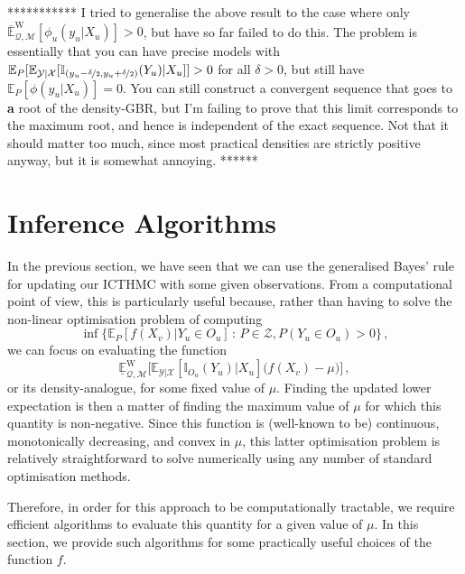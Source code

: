 \documentclass[twoside,11pt]{article}
\newcommand{\states}{\mathcal{X}}
\newcommand{\observs}{\mathcal{Y}}
\newcommand{\lexp}{\underline{\mathbb{E}}_{\rateset,\mathcal{M}}^\mathrm{W}}
\newcommand{\uexp}{\overline{\mathbb{E}}_{\rateset,\mathcal{M}}^\mathrm{W}}
\newcommand{\ind}[1]{\mathbb{I}_{#1}}
\newcommand{\rateset}{\mathcal{Q}}
\begin{document}
*********** I tried to generalise the above result to the case where only $\uexp[\phi_u(y_u\vert X_u)]>0$, but have so far failed to do this. The problem is essentially that you can have precise models with $\mathbb{E}_P[\mathbb{E}_{\observs\vert\states}[\ind{(y_u-\nicefrac{\delta}{2},y_u+\nicefrac{\delta}{2})}(Y_u)\vert X_u]] > 0$ for all $\delta>0$, but still have $\mathbb{E}_P[\phi(y_u\vert X_u)]=0$. You can still construct a convergent sequence that goes to {\bf a} root of the density-GBR, but I'm failing to prove that this limit corresponds to the maximum root, and hence is independent of the exact sequence. Not that it should matter too much, since most practical densities are strictly positive anyway, but it is somewhat annoying. ******


\section{Inference Algorithms}\label{sec:inference_algos}

In the previous section, we have seen that we can use the generalised Bayes' rule for updating our ICTHMC with some given observations. From a computational point of view, this is particularly useful because, rather than having to solve the non-linear optimisation problem of computing
\begin{equation*}
\inf\bigl\{\mathbb{E}_P[f(X_v)\vert Y_u\in O_u]\,:\, P\in\mathcal{Z},P(Y_u\in O_u)>0\bigr\}\,,
\end{equation*}
we can focus on evaluating the function
\begin{equation*}
\lexp\bigl[\mathbb{E}_{\observs\vert\states}[\ind{O_u}(Y_u)\vert X_u]\bigl(f(X_v) - \mu\bigr)\bigr]\,,
\end{equation*}
or its density-analogue, for some fixed value of $\mu$. Finding the updated lower expectation is then a matter of finding the maximum value of $\mu$ for which this quantity is non-negative. Since this function is (well-known to be) continuous, monotonically decreasing, and convex in $\mu$, this latter optimisation problem is relatively straightforward to solve numerically using any number of standard optimisation methods.

Therefore, in order for this approach to be computationally tractable, we require efficient algorithms to evaluate this quantity for a given value of $\mu$. In this section, we provide such algorithms for some practically useful choices of the function $f$.
\end{document}
